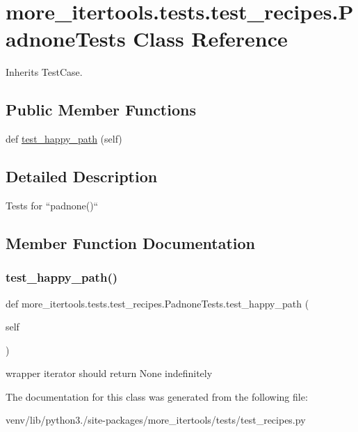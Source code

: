 \hypertarget{classmore__itertools_1_1tests_1_1test__recipes_1_1_padnone_tests}{}\section{more\+\_\+itertools.\+tests.\+test\+\_\+recipes.\+Padnone\+Tests Class Reference}
\label{classmore__itertools_1_1tests_1_1test__recipes_1_1_padnone_tests}


Inherits Test\+Case.

\subsection*{Public Member Functions}
\begin{DoxyCompactItemize}
\item 
def \hyperlink{classmore__itertools_1_1tests_1_1test__recipes_1_1_padnone_tests_aae5e1a348f6302d757f0141bdc7624da}{test\+\_\+happy\+\_\+path} (self)
\end{DoxyCompactItemize}


\subsection{Detailed Description}
\begin{DoxyVerb}Tests for ``padnone()``\end{DoxyVerb}
 

\subsection{Member Function Documentation}
\mbox{\label{classmore__itertools_1_1tests_1_1test__recipes_1_1_padnone_tests_aae5e1a348f6302d757f0141bdc7624da}} 
\subsubsection{\texorpdfstring{test\+\_\+happy\+\_\+path()}{test\_happy\_path()}}
{\footnotesize\ttfamily def more\+\_\+itertools.\+tests.\+test\+\_\+recipes.\+Padnone\+Tests.\+test\+\_\+happy\+\_\+path (\begin{DoxyParamCaption}\item[{}]{self }\end{DoxyParamCaption})}

\begin{DoxyVerb}wrapper iterator should return None indefinitely\end{DoxyVerb}
 

The documentation for this class was generated from the following file\+:\begin{DoxyCompactItemize}
\item 
venv/lib/python3./site-\/packages/more\+\_\+itertools/tests/test\+\_\+recipes.\+py\end{DoxyCompactItemize}
